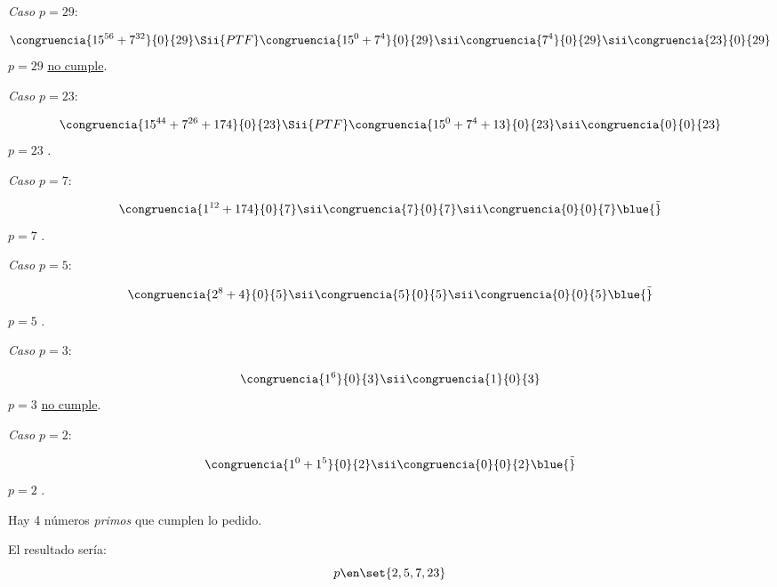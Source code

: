 \begin{enumerate}[label={\tiny \magenta{\faIcon[regular]{gamepad}}}]
  \item
        \textit{Caso $p = 29$}:\par
        $$
          \congruencia{15^{56} + 7^{32} }{0}{29}
          \Sii{PTF}
          \congruencia{15^{0} + 7^{4} }{0}{29}
          \sii
          \congruencia{7^{4}}{0}{29}
          \sii
          \congruencia{23}{0}{29}
        $$
        $p = 29$ \underline{no cumple}.

  \item
        \textit{Caso $p = 23$}:\par
        $$
          \congruencia{15^{44} + 7^{26} + 174 }{0}{23}
          \Sii{PTF}
          \congruencia{15^0 + 7^4 + 13}{0}{23}
          \sii
          \congruencia{0}{0}{23}
        $$
        $p = 23$ .

  \item
        \textit{Caso $p = 7$}:\par
        $$
          \congruencia{1^{12} + 174}{0}{7}
          \sii
          \congruencia{7}{0}{7}
          \sii
          \congruencia{0}{0}{7} \blue{\Tilde}
        $$
        $p = 7$ .

  \item

        \textit{Caso $p = 5$}:\par
        $$
          \congruencia{ 2^8 + 4}{0}{5}
          \sii
          \congruencia{5}{0}{5}
          \sii
          \congruencia{0}{0}{5} \blue{\Tilde}
        $$
        $p = 5$ .

  \item
        \textit{Caso $p = 3$}:\par
        $$
          \congruencia{1^6}{0}{3}
          \sii
          \congruencia{1}{0}{3}
        $$
        $p = 3$ \underline{no cumple}.

  \item
        \textit{Caso $p = 2$}:\par
        $$
          \congruencia{1^0 + 1^5}{0}{2}
          \sii
          \congruencia{0}{0}{2} \blue{\Tilde}
        $$
        $p = 2$ .
\end{enumerate}

Hay 4 números \textit{primos} que cumplen lo pedido.

\bigskip

El resultado sería:
$$
  p \en \set{2, 5, 7, 23}
$$

\begin{aportes}
  \item {}
  \item {}
\end{aportes}

